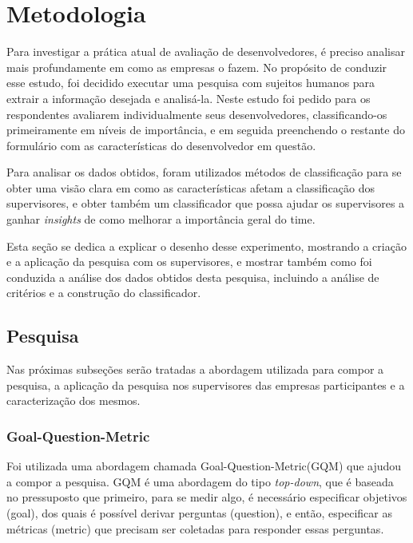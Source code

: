 \chapter[Metodolodia]{Metodologia}

Para investigar a prática atual de avaliação de desenvolvedores, é preciso analisar mais profundamente em como as empresas o fazem. No propósito de conduzir esse estudo, foi decidido executar uma pesquisa com sujeitos humanos para extrair a informação desejada e analisá-la. Neste estudo foi pedido para os respondentes avaliarem individualmente seus desenvolvedores, classificando-os primeiramente em níveis de importância, e em seguida preenchendo o restante do formulário com as características do desenvolvedor em questão.

Para analisar os dados obtidos, foram utilizados métodos de classificação para se obter uma visão clara em como as características afetam a classificação dos supervisores, e obter também um classificador que possa ajudar os supervisores a ganhar \textit{insights} de como melhorar a importância geral do time.

Esta seção se dedica a explicar o desenho desse experimento, mostrando a criação e a aplicação da pesquisa com os supervisores, e mostrar também como foi conduzida a análise dos dados obtidos desta pesquisa, incluindo a análise de critérios e a construção do classificador.

\section{Pesquisa}\label{secao3.2}

Nas próximas subseções serão tratadas a abordagem utilizada para compor a pesquisa, a aplicação da pesquisa nos supervisores das empresas participantes e a caracterização dos mesmos.

\subsection{Goal-Question-Metric}\label{secao3.2.1}
Foi utilizada uma abordagem chamada Goal-Question-Metric(GQM) \cite{Basili1994} que ajudou a compor a pesquisa. GQM é uma abordagem do tipo \textit{top-down}, que é baseada no pressuposto que primeiro, para se medir algo, é necessário especificar objetivos (goal), dos quais é possível derivar perguntas (question), e então, especificar as métricas (metric) que precisam ser coletadas para responder essas perguntas.

